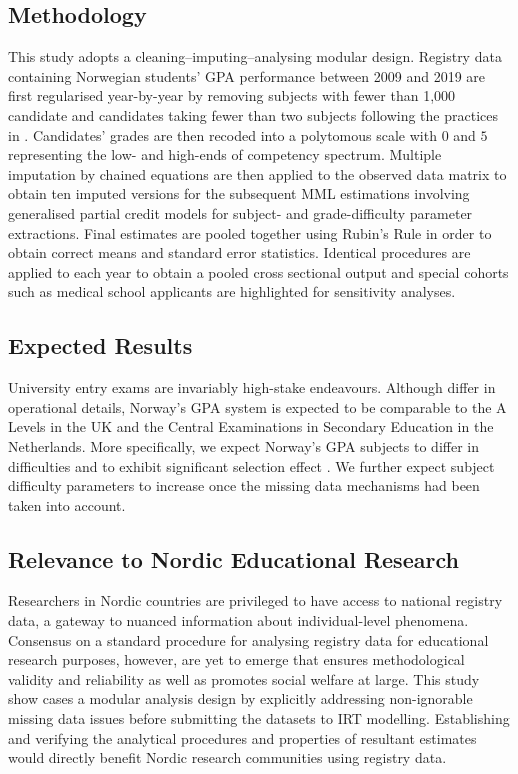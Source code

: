 \subsection{Methodology}

This study adopts a cleaning--imputing--analysing modular design. Registry data containing Norwegian students' GPA performance between 2009 and 2019 are first regularised year-by-year by removing subjects with fewer than 1,000 candidate and candidates taking fewer than two subjects following the practices in \textcite{he:2018}. Candidates' grades are then recoded into a polytomous scale with $0$ and $5$ representing the low- and high-ends of competency spectrum. Multiple imputation by chained equations are then applied to the observed data matrix to obtain ten imputed versions for the subsequent MML estimations involving generalised partial credit models \parencite[GPCM,][]{muraki:1992} for subject- and grade-difficulty parameter extractions. Final estimates are pooled together using Rubin's Rule \parencite{rubin:1987} in order to obtain correct means and standard error statistics. Identical procedures are applied to each year to obtain a pooled cross sectional output and special cohorts such as medical school applicants are highlighted for sensitivity analyses.

\subsection{Expected Results}

University entry exams are invariably high-stake endeavours. Although differ in operational details, Norway's GPA system is expected to be comparable to the A Levels in the UK and the Central Examinations in Secondary Education in the Netherlands. More specifically, we expect Norway's GPA subjects to differ in difficulties \parencite[per report by][]{he:2018} and to exhibit significant selection effect \parencite[as demonstrated in][]{korobko:2008}. We further expect subject difficulty parameters to increase once the missing data mechanisms had been taken into account.

\subsection{Relevance to Nordic Educational Research}

Researchers in Nordic countries are privileged to have access to national registry data, a gateway to nuanced information about individual-level phenomena. Consensus on a standard procedure for analysing registry data for educational research purposes, however, are yet to emerge that ensures methodological validity and reliability as well as promotes social welfare at large. This study show cases a modular analysis design by explicitly addressing non-ignorable missing data issues before submitting the datasets to IRT modelling. Establishing and verifying the analytical procedures and properties of resultant estimates would directly benefit Nordic research communities using registry data.

\printbibliography